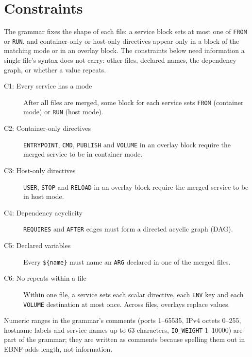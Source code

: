 \documentclass[a4paper,11pt]{article}
\begin{document}
\section{Constraints}

The grammar fixes the shape of each file: a service block sets at most one of
\texttt{FROM} or \texttt{RUN}, and container-only or host-only directives
appear only in a block of the matching mode or in an overlay block. The
constraints below need information a single file's syntax does not carry:
other files, declared names, the dependency graph, or whether a value repeats.

\begin{description}
  \item[C1: Every service has a mode] After all files are merged, some block
    for each service sets \texttt{FROM} (container mode) or \texttt{RUN} (host
    mode).

  \item[C2: Container-only directives] \texttt{ENTRYPOINT}, \texttt{CMD},
    \texttt{PUBLISH} and \texttt{VOLUME} in an overlay block require the merged
    service to be in container mode.

  \item[C3: Host-only directives] \texttt{USER}, \texttt{STOP} and
    \texttt{RELOAD} in an overlay block require the merged service to be in
    host mode.

  \item[C4: Dependency acyclicity] \texttt{REQUIRES} and \texttt{AFTER}
    edges must form a directed acyclic graph (DAG).

  \item[C5: Declared variables] Every \texttt{\$\{name\}} must name an
    \texttt{ARG} declared in one of the merged files.

  \item[C6: No repeats within a file] Within one file, a service sets each
    scalar directive, each \texttt{ENV} key and each \texttt{VOLUME}
    destination at most once. Across files, overlays replace values.
\end{description}

\noindent Numeric ranges in the grammar's comments (ports 1--65535, IPv4
octets 0--255, hostname labels and service names up to 63 characters,
\texttt{IO\_WEIGHT} 1--10000) are part of the grammar; they are written as
comments because spelling them out in EBNF adds length, not information.
\end{document}
